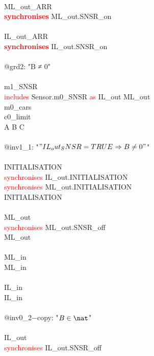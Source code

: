 \begin{description}
\begin{center}
\begin{Bcode}
			\Bend\\
			ML_out_ARR\\
			\textcolor{red}{\textbf{synchronises}} ML_out.SNSR_on\\
			\Bend\\
			IL_out_ARR\\
			\textcolor{red}{\textbf{synchronises}} IL_out.SNSR_on\\
			\Bwhen\\
			@grd2: "B ≠ 0"\\
			\Bend\\
			\Bend
			\else
			\Bmachine{} m1_SNSR\\
			\textcolor{red}{includes} Sensor.m0_SNSR \textcolor{red}{as} IL_out ML_out\\
			\Brefines{} m0_cars\\
			\Bsees{} c0_limit\\
			\Bvariables{} A B C\\
			\Binvariants\\
			\Btab @inv1_1: "\("IL_out_SNSR = TRUE \Rightarrow B \neq 0"\)"\\
			\Bevents\\
			\Btab INITIALISATION \Bextended\\
			\Btab \textcolor{red}{synchronises} IL_out.INITIALISATION\\
            \Btab \textcolor{red}{synchronises} ML_out.INITIALISATION\\
            \Btab \Brefines{} INITIALISATION\\
			\Btab \Bend\\
			\Btab ML_out \Bextended\\
			\Btab \textcolor{red}{synchronises} ML_out.SNSR_off\\
			\Btab \Brefines{} ML_out\\
			\Btab \Bend\\
			\Btab ML_in \Bextended\\
			\Btab \Brefines{} ML_in\\
			\Btab \Bend\\
			\Btab IL_in \Bextended\\
			\Btab \Brefines{} IL_in\\
			\Btab \Bwhen\\
			\Btab \Btab @inv0_2−copy: "\(B \in \nat\)" \Btheorem\\
			\Btab \Bend\\
			\Btab IL_out\\
			\Btab \textcolor{red}{synchronises} IL_out.SNSR_off\\

\end{Bcode}
\end{center}
\end{description}
